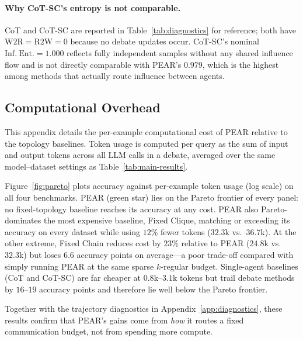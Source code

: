 \paragraph{Why CoT-SC's entropy is not comparable.}
CoT and CoT-SC are reported in Table~\ref{tab:diagnostics} for reference; both have $\mathrm{W2R}=\mathrm{R2W}=0$ because no debate updates occur. CoT-SC's nominal $\mathrm{Inf.\ Ent.}=1.000$ reflects fully independent samples without any shared influence flow and is not directly comparable with PEAR's $0.979$, which is the highest among methods that actually route influence between agents.






\subsection{Computational Overhead}
\label{app:overhead}
This appendix details the per-example computational cost of PEAR relative to the topology baselines. Token usage is computed per query as the sum of input and output tokens across all LLM calls in a debate, averaged over the same model--dataset settings as Table~\ref{tab:main-results}.
 
Figure~\ref{fig:pareto} plots accuracy against per-example token usage (log scale) on all four benchmarks. PEAR (green star) lies on the Pareto frontier of every panel: no fixed-topology baseline reaches its accuracy at any cost. PEAR also Pareto-dominates the most expensive baseline, Fixed Clique, matching or exceeding its accuracy on every dataset while using $12\%$ fewer tokens ($32.3$k vs.\ $36.7$k). At the other extreme, Fixed Chain reduces cost by $23\%$ relative to PEAR ($24.8$k vs.\ $32.3$k) but loses $6.6$ accuracy points on average---a poor trade-off compared with simply running PEAR at the same sparse $k$-regular budget. Single-agent baselines (CoT and CoT-SC) are far cheaper at $0.8$k--$3.1$k tokens but trail debate methods by $16$--$19$ accuracy points and therefore lie well below the Pareto frontier.

 
Together with the trajectory diagnostics in Appendix~\ref{app:diagnostics}, these results confirm that PEAR's gains come from \emph{how} it routes a fixed communication budget, not from spending more compute.
